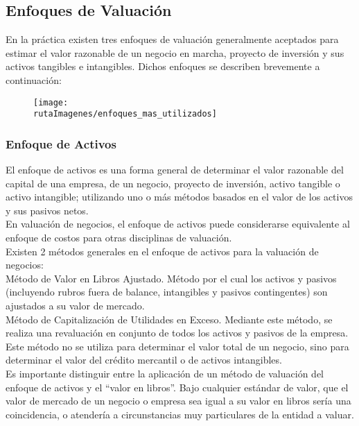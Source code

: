 \subsection{Enfoques de Valuación}

En la pr\'actica existen tres enfoques de valuaci\'on generalmente aceptados para estimar el valor razonable de un negocio en marcha, proyecto de inversi\'on y sus activos tangibles e intangibles. Dichos enfoques se describen brevemente a continuaci\'on:

\begin{figure}[H]
\centering
\texttt{[image: \\rutaImagenes/enfoques\_mas\_utilizados]}
\end{figure}


\subsubsection{Enfoque de Activos}

El enfoque de activos es una forma general de determinar el valor razonable del capital de una empresa, de un negocio, proyecto de inversi\'on, activo tangible o activo intangible; utilizando uno o m\'as m\'etodos basados en el valor de los activos y sus pasivos netos.\\[10pt]

En valuaci\'on de negocios, el enfoque de activos puede considerarse equivalente al enfoque de costos para otras disciplinas de valuaci\'on.\\[10pt]

Existen 2 m\'etodos generales en el enfoque de activos para la valuaci\'on de negocios:\\[10pt]

\textcolor{secundario}{M\'etodo de Valor en Libros Ajustado.} M\'etodo por el cual los activos y pasivos (incluyendo rubros fuera de balance, intangibles y pasivos contingentes) son ajustados a su valor de mercado.\\[10pt]

\textcolor{secundario}{M\'etodo de Capitalizaci\'on de Utilidades en Exceso.} Mediante este m\'etodo, se realiza una revaluaci\'on en conjunto de todos los activos y pasivos de la empresa. Este m\'etodo no se utiliza para determinar el valor total de un negocio, sino para determinar el valor del cr\'edito mercantil o de activos intangibles.\\[10pt]

Es importante distinguir entre la aplicaci\'on de un m\'etodo de valuaci\'on del enfoque de activos y el ``valor en libros''. Bajo cualquier est\'andar de valor, que el valor de mercado de un negocio o empresa sea igual a su valor en libros ser\'ia una coincidencia, o atender\'ia a circunstancias muy particulares de la entidad a valuar.

